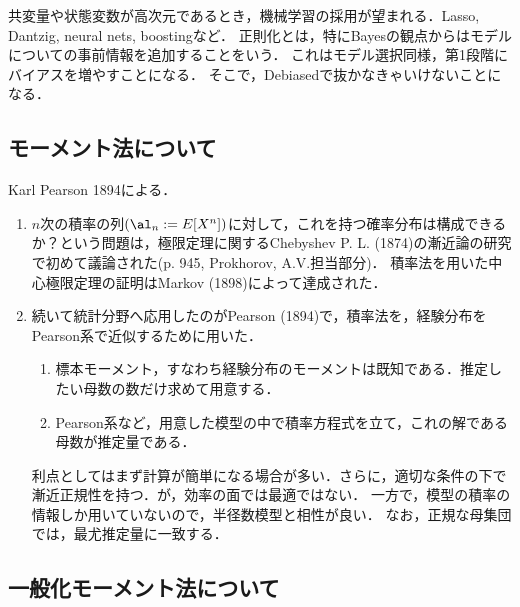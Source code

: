 \documentclass[uplatex,dvipdfmx]{jsreport}
\begin{document}
共変量や状態変数が高次元であるとき，機械学習の採用が望まれる．Lasso, Dantzig, neural nets, boostingなど．
正則化とは，特にBayesの観点からはモデルについての事前情報を追加することをいう．
これはモデル選択同様，第1段階にバイアスを増やすことになる．
そこで，Debiasedで抜かなきゃいけないことになる．

\subsection{モーメント法について}

\begin{tcolorbox}[colframe=ForestGreen, colback=ForestGreen!10!white,breakable,colbacktitle=ForestGreen!40!white,coltitle=black,fonttitle=\bfseries\sffamily,
title=]
    Karl Pearson 1894による．
\end{tcolorbox}

\begin{history}\mbox{}
    \begin{enumerate}
        \item $n$次の積率の列$(\al_n:=E[X^n])$に対して，これを持つ確率分布は構成できるか？という問題は，極限定理に関するChebyshev P. L. (1874)の漸近論の研究で初めて議論された(\cite{Hazewinkel89-EncyclopaediaOfMath3}p. 945, Prokhorov, A.V.担当部分)．
        積率法を用いた中心極限定理の証明はMarkov (1898)によって達成された．
        \item 続いて統計分野へ応用したのがPearson (1894)で，積率法を，経験分布をPearson系で近似するために用いた．
        \begin{enumerate}
            \item 標本モーメント，すなわち経験分布のモーメントは既知である．推定したい母数の数だけ求めて用意する．
            \item Pearson系など，用意した模型の中で積率方程式を立て，これの解である母数が推定量である．
        \end{enumerate}
        利点としてはまず計算が簡単になる場合が多い．さらに，適切な条件の下で漸近正規性を持つ．が，効率の面では最適ではない．
        一方で，模型の積率の情報しか用いていないので，半径数模型と相性が良い．
        なお，正規な母集団では，最尤推定量に一致する．
    \end{enumerate}
\end{history}

\subsection{一般化モーメント法について}
\end{document}
